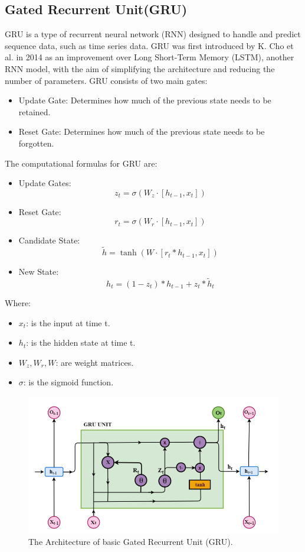 \documentclass{ieeeojies}
\begin{document}
\subsection{Gated Recurrent Unit(GRU)}
GRU is a type of recurrent neural network (RNN) designed to handle and predict sequence data, such as time series data. GRU was first introduced by K. Cho et al. in 2014 as an improvement over Long Short-Term Memory (LSTM), another RNN model, with the aim of simplifying the architecture and reducing the number of parameters. GRU consists of two main gates:
\begin{itemize}
  \item Update Gate: Determines how much of the previous state needs to be retained.
  \item Reset Gate: Determines how much of the previous state needs to be forgotten.
\end{itemize}
The computational formulas for GRU are:
\begin{itemize}
  \item Update Gates: \[z_t = \sigma(W_z \cdot [h_{t-1}, x_t]) \]
  \item Reset Gate: \[r_t = \sigma(W_r \cdot [h_{t-1}, x_t])\]
  \item Candidate State: \[\tilde{h} = \tanh(W \cdot [r_t*h_{t-1}, x_t])\]
  \item New State: \[h_t = (1 - z_t) * h_{t-1} + z_t * \tilde{h}_t \]
\end{itemize}
Where:
\begin{itemize}
  \item \(x_t\): is the input at time t.
  \item \(h_t\): is the hidden state at time t.
  \item \(W_z, W_r, W\): are weight matrices.
  \item \(\sigma\): is the sigmoid function.\cite{b12, b20, b21}
\end{itemize}
\begin{figure}[H]
  \centering
  \begin{minipage}{1\linewidth}
    \centering
    \includegraphics[width=\linewidth]{Image/GRU/model_gru.png}
    \caption{The Architecture of basic Gated Recurrent Unit (GRU).}
    \label{fig:7}
  \end{minipage}
\end{figure}
\end{document}
